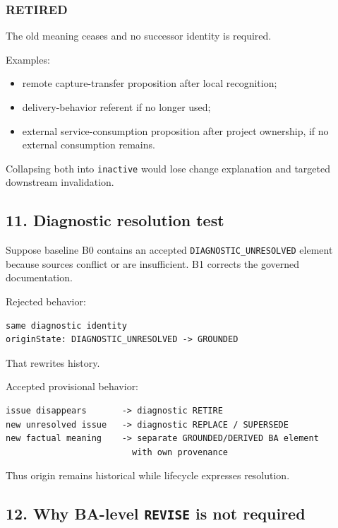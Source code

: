 \documentclass[11pt,a4paper]{article}
\providecommand{\tightlist}{\setlength{\itemsep}{0pt}\setlength{\parskip}{0pt}}\setlength{\emergencystretch}{4em}\hbadness=10000\hfuzz=20pt\sloppy
\begin{document}
\subsubsection{RETIRED}\label{retired}

The old meaning ceases and no successor identity is required.

Examples:

\begin{itemize}
\tightlist
\item
  remote capture-transfer proposition after local recognition;
\item
  delivery-behavior referent if no longer used;
\item
  external service-consumption proposition after project ownership, if
  no external consumption remains.
\end{itemize}

Collapsing both into \texttt{inactive} would lose change explanation and
targeted downstream invalidation.

\subsection{11. Diagnostic resolution
test}\label{diagnostic-resolution-test}

Suppose baseline B0 contains an accepted \texttt{DIAGNOSTIC\_UNRESOLVED}
element because sources conflict or are insufficient. B1 corrects the
governed documentation.

Rejected behavior:

\begin{verbatim}
same diagnostic identity
originState: DIAGNOSTIC_UNRESOLVED -> GROUNDED
\end{verbatim}

That rewrites history.

Accepted provisional behavior:

\begin{verbatim}
issue disappears       -> diagnostic RETIRE
new unresolved issue   -> diagnostic REPLACE / SUPERSEDE
new factual meaning    -> separate GROUNDED/DERIVED BA element
                         with own provenance
\end{verbatim}

Thus origin remains historical while lifecycle expresses resolution.

\subsection{\texorpdfstring{12. Why BA-level \texttt{REVISE} is not
required}{12. Why BA-level REVISE is not required}}\label{why-ba-level-revise-is-not-required}
\end{document}
